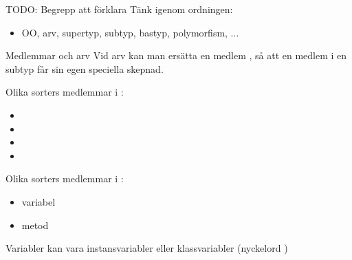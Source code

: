 


\begin{Slide}{TODO: Begrepp att förklara}
  Tänk igenom ordningen:
  \begin{itemize}
    \item OO, arv, supertyp, subtyp, bastyp, polymorfism, ... 
  \end{itemize}
\end{Slide}


\begin{Slide}{Medlemmar och arv}\footnotesize
Vid arv kan man ersätta en medlem , så att en medlem i en subtyp får sin egen speciella skepnad.

\begin{multicols}{2}
Olika sorters medlemmar i :
\begin{itemize}
\item {}
\item {}
\item {}
\item {}

\end{itemize}

\columnbreak

Olika sorters medlemmar i :
\begin{itemize}
\item variabel 
\item metod
\end{itemize}

\vspace{1em}

Variabler kan vara instansvariabler eller klassvariabler (nyckelord )

\end{multicols}

\pause

\noindent
{}

\end{Slide}


